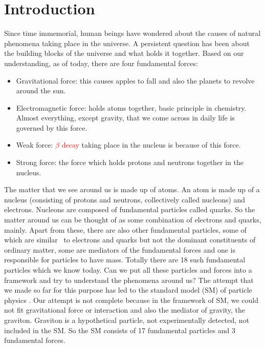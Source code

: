 \chapter{Introduction} %

\label{Chap0}
Since time immemorial, human beings have wondered about the causes of natural phenomena taking place in the universe.
A persistent question has been about the building blocks of the universe and what holds it together.
Based on our understanding, as of today, there are four fundamental forces:
\begin{itemize}
\item Gravitational force: this causes apples to fall and also the planets to revolve around the sun.
\item Electromagnetic force: holds atoms together, basic principle in chemistry. Almost everything, except gravity, that we come across in daily life is governed by this force.
\item Weak force: \textcolor{red}{$\beta$ decay} taking place in the nucleus is because of this force.
\item Strong force: the force which holds protons and neutrons together in the nucleus.
\end{itemize}
The matter that we see around us is made up of atoms. An atom is made up of a nucleus (consisting of protons and neutrons, collectively 
called nucleons) and electrons. Nucleons are composed of fundamental particles called quarks. So the matter around us can be thought of as 
some combination of electrons and quarks, mainly. Apart from these, there are also other fundamental particles, some of which are similar \
to electrons and quarks but not the dominant constituents of ordinary matter, some are mediators of the fundamental forces and one is responsible 
for particles to have mass. Totally there are 18 such fundamental particles which we know today. Can we put all these particles and forces 
into a framework and try to understand the phenomena around us? The attempt that we made so far for this purpose has led to the standard 
model (SM) of particle physics \cite{PhysRevLett.19.1264,RevModPhys.52.525,GLASHOW1961579}. Our attempt is not complete because in the 
framework of SM, we could not fit gravitational force or interaction and also the mediator of gravity, the graviton. Graviton is a 
hypothetical particle, not experimentally detected, not included in the SM. So the SM consists of 17 fundamental particles and 3 
fundamental forces.

